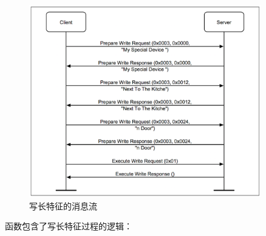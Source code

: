 \documentclass[lang=cn,newtx,10pt,scheme=chinese]{elegantbook}
\begin{document}
\begin{figure}[!htbp]
\centering
\includegraphics[width=0.9\textwidth]{GATT_Server_Figure_2.png}
\caption{写长特征的消息流}
\end{figure}

函数包含了写长特征过程的逻辑：
\end{document}
